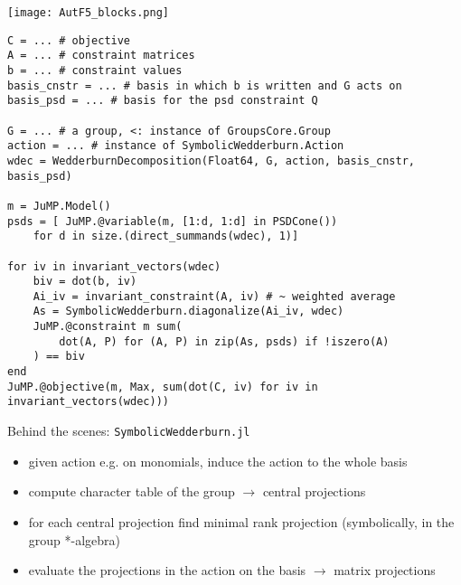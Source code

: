 \begin{frame}
\begin{center}
\vfill
\texttt{[image: AutF5\_blocks.png]}
\vfill
\end{center}
\end{frame}

\begin{frame}
\centering
{}


\end{frame}



\begin{frame}[fragile]
\scriptsize
\begin{verbatim}
C = ... # objective
A = ... # constraint matrices
b = ... # constraint values
basis_cnstr = ... # basis in which b is written and G acts on
basis_psd = ... # basis for the psd constraint Q

G = ... # a group, <: instance of GroupsCore.Group
action = ... # instance of SymbolicWedderburn.Action
wdec = WedderburnDecomposition(Float64, G, action, basis_cnstr, basis_psd)

m = JuMP.Model()
psds = [ JuMP.@variable(m, [1:d, 1:d] in PSDCone())
    for d in size.(direct_summands(wdec), 1)]

for iv in invariant_vectors(wdec)
    biv = dot(b, iv)
    Ai_iv = invariant_constraint(A, iv) # ~ weighted average
    As = SymbolicWedderburn.diagonalize(Ai_iv, wdec)
    JuMP.@constraint m sum(
        dot(A, P) for (A, P) in zip(As, psds) if !iszero(A)
    ) == biv
end
JuMP.@objective(m, Max, sum(dot(C, iv) for iv in invariant_vectors(wdec)))

\end{verbatim}

\end{frame}


\begin{frame}{Behind the scenes: \texttt{SymbolicWedderburn.jl}}
    \begin{itemize}
      \item given action e.g. on monomials, \alert{induce} the action to the whole basis
      \item compute \alert{character table} of the group $\longrightarrow$ central projections
      \item for each central projection find minimal rank projection (symbolically, in the group *-algebra)
      \item evaluate the projections in the action on the basis $\longrightarrow$ \alert{matrix projections}
    \end{itemize}
\end{frame}


